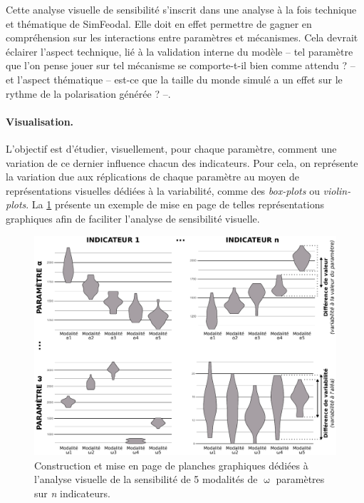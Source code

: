 Cette analyse visuelle de sensibilité s'inscrit dans une analyse à la fois technique et thématique de SimFeodal.
Elle doit en effet permettre de gagner en compréhension sur les interactions entre paramètres et mécanismes.
Cela devrait éclairer l'aspect technique, lié à la validation interne du modèle -- tel paramètre que l'on pense jouer sur tel mécanisme se comporte-t-il bien comme attendu ? -- et l'aspect thématique -- est-ce que la taille du monde simulé a un effet sur le rythme de la polarisation générée ? --.


\paragraph{Visualisation.}

L'objectif est d'étudier, visuellement, pour chaque paramètre, comment une variation de ce dernier influence chacun des indicateurs.
Pour cela, on représente la variation due aux réplications de chaque paramètre au moyen de représentations visuelles dédiées à la variabilité, comme des \textit{box-plots} ou \textit{violin-plots}.
La \cref{fig:exemple-visu-sensib} présente un exemple de mise en page de telles représentations graphiques afin de faciliter l'analyse de sensibilité visuelle.
\begin{figure}[H]
	\centering
	\includegraphics[width=\linewidth]{img/schema_violinplots_sensib.pdf}
	\caption{Construction et mise en page de planches graphiques dédiées à l'analyse visuelle de la sensibilité de 5 modalités de $\upomega$ paramètres sur \textit{n} indicateurs.}
	\label{fig:exemple-visu-sensib}
\end{figure}

